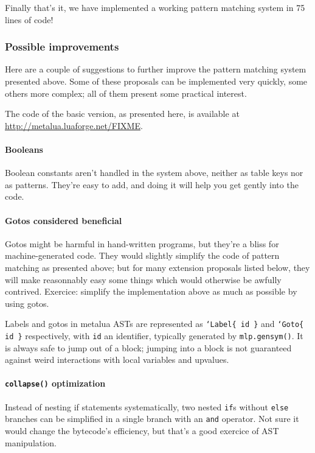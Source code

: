 \noindent Finally that's it, we have implemented a working pattern
matching system in 75 lines of code!

\subsubsection{Possible improvements}
Here are a couple of suggestions to further improve the pattern
matching system presented above. Some of these proposals can be
implemented very quickly, some others more complex; all of them
present some practical interest.

The code of the basic version, as presented here, is available at
\url{http://metalua.luaforge.net/FIXME}.

\paragraph{Booleans} Boolean constants aren't handled in the system
above, neither as table keys nor as patterns. They're easy to add, and
doing it will help you get gently into the code.

\paragraph{Gotos considered beneficial} Gotos might be harmful in
hand-written programs, but they're a bliss for machine-generated
code. They would slightly simplify the code of pattern matching as
presented above; but for many extension proposals listed below, they
will make reasonnably easy some things which would otherwise be
awfully contrived. Exercice: simplify the implementation above as much
as possible by using gotos.

Labels and gotos in metalua ASTs are represented as {\tt`Label\{ id
  \}} and {\tt`Goto\{ id \}} respectively, with {\tt id} an
identifier, typically generated by {\tt mlp.gensym()}. It is always
safe to jump out of a block; jumping into a block is not guaranteed
against weird interactions with local variables and upvalues.

\paragraph{{\tt collapse()} optimization} Instead of nesting if
statements systematically, two nested {\tt if}s without {\tt else}
branches can be simplified in a single branch with an {\tt and}
operator. Not sure it would change the bytecode's efficiency, but
that's a good exercice of AST manipulation.

